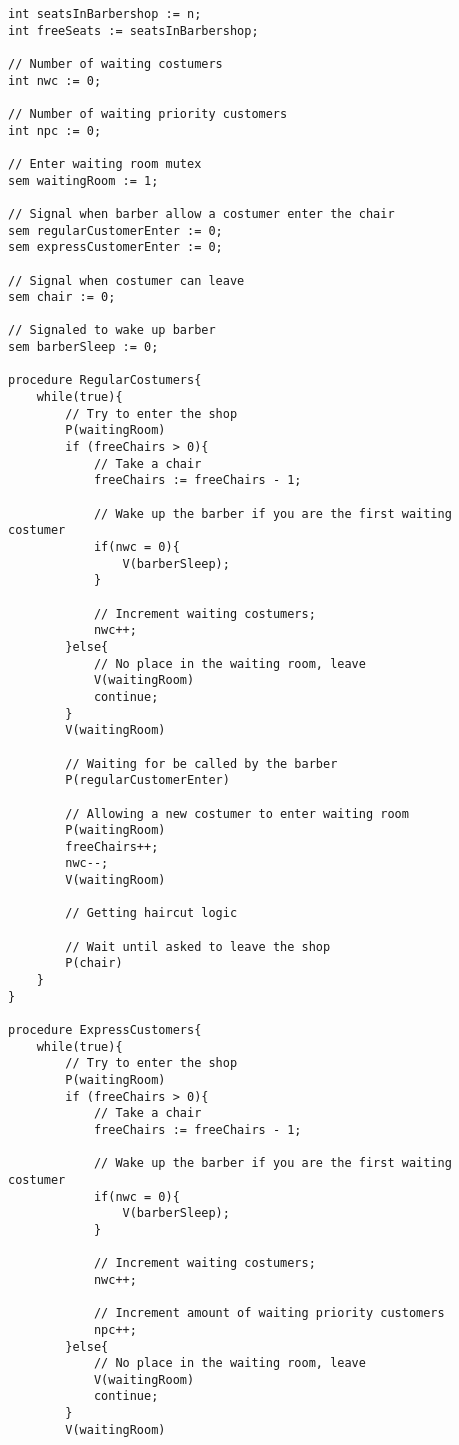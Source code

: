 \begin{lstlisting}
int seatsInBarbershop := n;
int freeSeats := seatsInBarbershop;

// Number of waiting costumers
int nwc := 0;

// Number of waiting priority customers 
int npc := 0;  

// Enter waiting room mutex 
sem waitingRoom := 1; 

// Signal when barber allow a costumer enter the chair
sem regularCustomerEnter := 0; 
sem expressCustomerEnter := 0; 

// Signal when costumer can leave 
sem chair := 0; 

// Signaled to wake up barber
sem barberSleep := 0; 

procedure RegularCostumers{
    while(true){
        // Try to enter the shop
        P(waitingRoom)
        if (freeChairs > 0){
            // Take a chair 
            freeChairs := freeChairs - 1; 

            // Wake up the barber if you are the first waiting costumer
            if(nwc = 0){
                V(barberSleep);
            }

            // Increment waiting costumers; 
            nwc++;
        }else{
            // No place in the waiting room, leave 
            V(waitingRoom)
            continue;
        }
        V(waitingRoom)

        // Waiting for be called by the barber
        P(regularCustomerEnter)

        // Allowing a new costumer to enter waiting room
        P(waitingRoom)
        freeChairs++;
        nwc--; 
        V(waitingRoom)

        // Getting haircut logic 

        // Wait until asked to leave the shop 
        P(chair)
    }
}

procedure ExpressCustomers{
    while(true){
        // Try to enter the shop
        P(waitingRoom)
        if (freeChairs > 0){
            // Take a chair 
            freeChairs := freeChairs - 1; 

            // Wake up the barber if you are the first waiting costumer
            if(nwc = 0){
                V(barberSleep);
            }

            // Increment waiting costumers; 
            nwc++;

            // Increment amount of waiting priority customers
            npc++;
        }else{
            // No place in the waiting room, leave 
            V(waitingRoom)
            continue;
        }
        V(waitingRoom)


\end{lstlisting}
